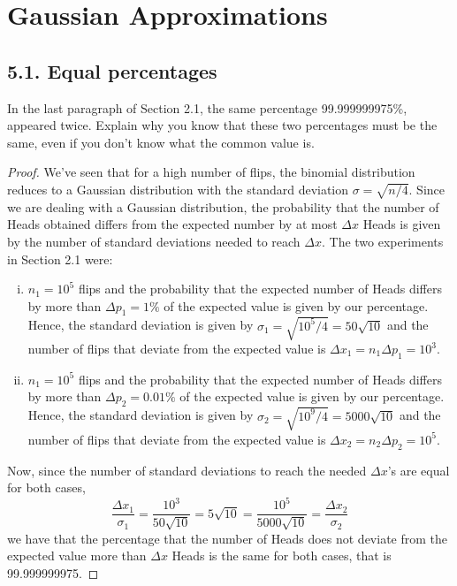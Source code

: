 \chapter{Gaussian Approximations}

\section*{5.1. Equal percentages}
In the last paragraph of Section 2.1, the same percentage
99.999999975\%, appeared twice. Explain why you know that 
these two percentages must be the same, even if you don't
know what the common value is.

\vspace{1em}

\begin{proof}
    We've seen that for a high number of flips, the binomial 
    distribution reduces to a Gaussian distribution
    with the standard deviation $\sigma = \sqrt{n/4}$. Since we are dealing with a 
    Gaussian distribution, the probability that the number of Heads
    obtained differs from the expected number by at most $\Delta x$ Heads is given
    by the number of standard deviations needed to reach $\Delta x$.
    The two experiments in Section 2.1 were:
    \begin{enumerate}[(i)]
        \item $n_1 = 10^5$ flips and the probability that the expected number of
            Heads differs by more than $\Delta p_1 = 1\%$ of the expected value
            is given by our percentage. Hence, the standard deviation is given by
            $\sigma_1 = \sqrt{10^5 / 4} = 50\sqrt{10}$ and the number of flips
            that deviate from the expected value is $\Delta x_1 = n_1 \Delta p_1 = 10^3$.

        \item $n_1 = 10^5$ flips and the probability that the expected number of
            Heads differs by more than $\Delta p_2 = 0.01\%$ of the expected value
            is given by our percentage. Hence, the standard deviation is given by
            $\sigma_2 = \sqrt{10^9 / 4} = 5000\sqrt{10}$ and the number of flips
            that deviate from the expected value is $\Delta x_2 = n_2 \Delta p_2 = 10^5$.
    \end{enumerate}

    Now, since the number of standard deviations to reach the needed $\Delta x$'s are
    equal for both cases,
    \[
        \frac{\Delta x_1}{\sigma_1} = \frac{10^3}{50\sqrt{10}} = 5 \sqrt{10}
        = \frac{10^5}{5000\sqrt{10}} 
        = \frac{\Delta x_2}{\sigma_2}
    \] 
    we have that the percentage that the number of Heads does not deviate
    from the expected value more than $\Delta x$ Heads is the same for both
    cases, that is 99.999999975.
\end{proof}

